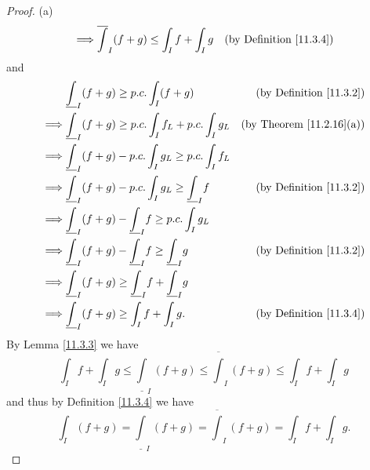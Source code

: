 \begin{proof}{(a)}
\begin{align*}
        \implies & \overline{\int}_I (f + g) \leq \int_I f + \int_I g                       & \text{(by Definition \ref{11.3.4})}
    \end{align*}
    and
    \begin{align*}
                 & \underline{\int}_I (f + g) \geq p.c. \int_I (f + g)                         & \text{(by Definition \ref{11.3.2})}  \\
        \implies & \underline{\int}_I (f + g) \geq p.c. \int_I f_L + p.c. \int_I g_L           & \text{(by Theorem \ref{11.2.16}(a))} \\
        \implies & \underline{\int}_I (f + g) - p.c. \int_I g_L \geq p.c. \int_I f_L                                                  \\
        \implies & \underline{\int}_I (f + g) - p.c. \int_I g_L \geq \underline{\int}_I f      & \text{(by Definition \ref{11.3.2})}  \\
        \implies & \underline{\int}_I (f + g) - \underline{\int}_I f \geq p.c. \int_I g_L                                             \\
        \implies & \underline{\int}_I (f + g) - \underline{\int}_I f \geq \underline{\int}_I g & \text{(by Definition \ref{11.3.2})}  \\
        \implies & \underline{\int}_I (f + g) \geq \underline{\int}_I f + \underline{\int}_I g &                                      \\
        \implies & \underline{\int}_I (f + g) \geq \int_I f + \int_I g.                        & \text{(by Definition \ref{11.3.4})}
    \end{align*}
    By Lemma \ref{11.3.3} we have
    \[
        \int_I f + \int_I g \leq \underline{\int}_I (f + g) \leq \overline{\int}_I (f + g) \leq \int_I f + \int_I g
    \]
    and thus by Definition \ref{11.3.4} we have
    \[
        \int_I (f + g) = \underline{\int}_I (f + g) = \overline{\int}_I (f + g) = \int_I f + \int_I g.
    \]
\end{proof}

